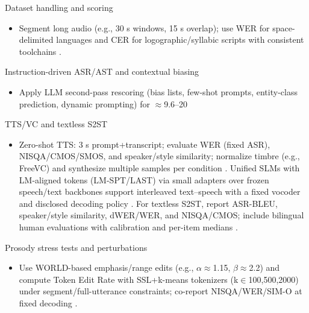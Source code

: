 \documentclass{article}
\begin{document}
Dataset handling and scoring
\begin{itemize}
  \item Segment long audio (e.g., 30 s windows, 15 s overlap); use WER for space-delimited languages and CER for logographic/syllabic scripts with consistent toolchains \cite{nguyen2025qwenvsgemmaintegrationwhispercomparative}.
\end{itemize}

Instruction-driven ASR/AST and contextual biasing
\begin{itemize}
  \item Apply LLM second-pass rescoring (bias lists, few-shot prompts, entity-class prediction, dynamic prompting) for $\approx$9.6--20%
\end{itemize}

TTS/VC and textless S2ST
\begin{itemize}
  \item Zero-shot TTS: 3 s prompt+transcript; evaluate WER (fixed ASR), NISQA/CMOS/SMOS, and speaker/style similarity; normalize timbre (e.g., FreeVC) and synthesize multiple samples per condition \cite{wang2024evaluatingtextspeechsynthesislargediscre}. Unified SLMs with LM-aligned tokens (LM-SPT/LAST) via small adapters over frozen speech/text backbones support interleaved text--speech with a fixed vocoder and disclosed decoding policy \cite{turetzky2024lastlanguagemodelawarespeechtokenization,wang2023slmbridgethingapbetweenspeechtextfoundat,jo2025lmsptalignedsemanticdistillationspeechto}. For textless S2ST, report ASR-BLEU, speaker/style similarity, dWER/WER, and NISQA/CMOS; include bilingual human evaluations with calibration and per-item medians \cite{peng2024mslms2stmultitaskspeechlanguagemodeltext,li2024investigatingneuralaudiocodecsspeechlang,huang2023holisticcascadesystembenchmarkhumanevalu}.
\end{itemize}

Prosody stress tests and perturbations
\begin{itemize}
  \item Use WORLD-based emphasis/range edits (e.g., $\alpha$$\approx$1.15, $\beta$$\approx$2.2) and compute Token Edit Rate with SSL+k-means tokenizers (k$\in${100,500,2000}) under segment/full-utterance constraints; co-report NISQA/WER/SIM-O at fixed decoding \cite{li2024investigatingneuralaudiocodecsspeechlang}.
\end{itemize}
\end{document}
